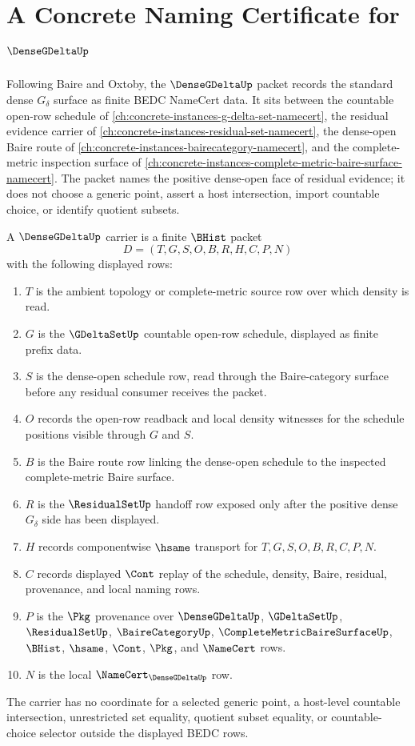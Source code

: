 \chapter{A Concrete Naming Certificate for $\DenseGDeltaUp$}
\label{ch:concrete-instances-dense-g-delta-namecert}

Following Baire and Oxtoby, the $\DenseGDeltaUp$ packet records the standard dense $G_\delta$ surface as finite BEDC NameCert data. It sits between the countable open-row schedule of \autoref{ch:concrete-instances-g-delta-set-namecert}, the residual evidence carrier of \autoref{ch:concrete-instances-residual-set-namecert}, the dense-open Baire route of \autoref{ch:concrete-instances-bairecategory-namecert}, and the complete-metric inspection surface of \autoref{ch:concrete-instances-complete-metric-baire-surface-namecert}. The packet names the positive dense-open face of residual evidence; it does not choose a generic point, assert a host intersection, import countable choice, or identify quotient subsets.

\begin{definition}
\label{def:dense-gdelta-carrier}
A $\DenseGDeltaUp$ carrier is a finite $\BHist$ packet
$$
D=(T,G,S,O,B,R,H,C,P,N)
$$
with the following displayed rows:
\begin{enumerate}
\item $T$ is the ambient topology or complete-metric source row over which density is read.
\item $G$ is the $\GDeltaSetUp$ countable open-row schedule, displayed as finite prefix data.
\item $S$ is the dense-open schedule row, read through the Baire-category surface before any residual consumer receives the packet.
\item $O$ records the open-row readback and local density witnesses for the schedule positions visible through $G$ and $S$.
\item $B$ is the Baire route row linking the dense-open schedule to the inspected complete-metric Baire surface.
\item $R$ is the $\ResidualSetUp$ handoff row exposed only after the positive dense $G_\delta$ side has been displayed.
\item $H$ records componentwise $\hsame$ transport for $T,G,S,O,B,R,C,P,N$.
\item $C$ records displayed $\Cont$ replay of the schedule, density, Baire, residual, provenance, and local naming rows.
\item $P$ is the $\Pkg$ provenance over $\DenseGDeltaUp$, $\GDeltaSetUp$, $\ResidualSetUp$, $\BaireCategoryUp$, $\CompleteMetricBaireSurfaceUp$, $\BHist$, $\hsame$, $\Cont$, $\Pkg$, and $\NameCert$ rows.
\item $N$ is the local $\NameCert_{\DenseGDeltaUp}$ row.
\end{enumerate}
The carrier has no coordinate for a selected generic point, a host-level countable intersection, unrestricted set equality, quotient subset equality, or countable-choice selector outside the displayed BEDC rows.
\end{definition}

